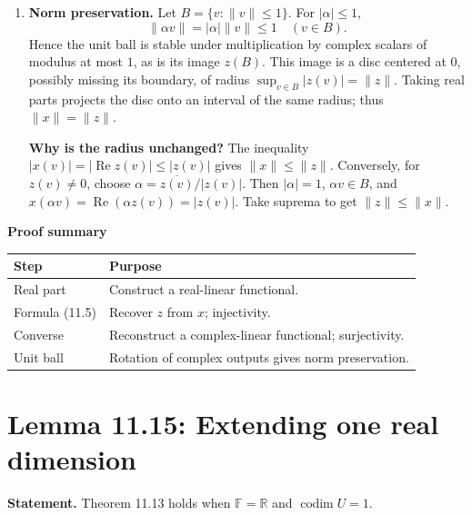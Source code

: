 \documentclass[11pt,a4paper]{article}
\newcommand{\F}{\mathbb F}
\newenvironment{proofsteps}{\begin{enumerate}\setlength{\itemsep}{4pt}}{\end{enumerate}}
\newcommand{\prooftable}[1]{\medskip\textbf{Proof summary}\par\smallskip #1\medskip}
\begin{document}
\begin{proofsteps}
\item \textbf{Norm preservation.} Let \(B=\{v:\|v\|\leq1\}\). For \(|\alpha|\leq1\),
\[
 \|\alpha v\|=|\alpha|\|v\|\leq1\quad(v\in B).
\]
Hence the unit ball is stable under multiplication by complex scalars of modulus at most \(1\), as is its image \(z(B)\). This image is a disc centered at \(0\), possibly missing its boundary, of radius
\(\sup_{v\in B}|z(v)|=\|z\|\).
Taking real parts projects the disc onto an interval of the same radius; thus \(\|x\|=\|z\|\).
\begin{personalnote}
\textbf{Why is the radius unchanged?} The inequality
\(|x(v)|=|\operatorname{Re}z(v)|\leq|z(v)|\)
gives \(\|x\|\leq\|z\|\). Conversely, for \(z(v)\ne0\), choose
\(\alpha=\overline{z(v)}/|z(v)|\). Then \(|\alpha|=1\), \(\alpha v\in B\), and
\(x(\alpha v)=\operatorname{Re}(\alpha z(v))=|z(v)|\).
Take suprema to get \(\|z\|\leq\|x\|\).
\end{personalnote}
\end{proofsteps}
\prooftable{\begin{tabularx}{\linewidth}{@{}p{.28\linewidth}X@{}}\hline
Step & Purpose\\\hline
Real part & Construct a real-linear functional.\\
Formula (11.5) & Recover \(z\) from \(x\); injectivity.\\
Converse & Reconstruct a complex-linear functional; surjectivity.\\
Unit ball & Rotation of complex outputs gives norm preservation.\\\hline
\end{tabularx}}

\section{Lemma 11.15: Extending one real dimension}
\textbf{Statement.} Theorem 11.13 holds when \(\F=\mathbb R\) and \(\operatorname{codim}U=1\).
\end{document}
